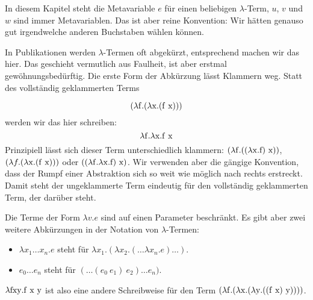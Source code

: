 In diesem Kapitel steht die Metavariable $e$ für einen
beliebigen $\lambda$-Term, $u$, $v$ und $w$ sind immer Metavariablen.
Das ist aber reine Konvention: Wir hätten genauso gut irgendwelche
anderen Buchstaben wählen können.

In Publikationen werden $\lambda$-Termen oft abgekürzt, entsprechend
machen wir das hier.  Das geschieht vermutlich aus Faulheit, ist aber
erstmal gewöhnungsbedürftig.  Die erste Form der Abkürzung lässt
Klammern weg.  Statt des vollständig geklammerten Terms

\begin{displaymath}
  (\lambda \mathrm f.(\lambda \mathrm x.(\mathrm f~\mathrm x)))
\end{displaymath}
%
werden wir das hier schreiben: 
%
\begin{displaymath}
  \lambda \mathrm f.\lambda \mathrm x.\mathrm f~\mathrm x
\end{displaymath}
%
Prinzipiell lässt sich dieser Term unterschiedlich
klammern: $(\lambda \mathrm f.((\lambda \mathrm x.\mathrm f)~\mathrm x))$, $(\lambda
f.(\lambda \mathrm x.(\mathrm f~\mathrm x)))$ oder $((\lambda \mathrm f.\lambda
\mathrm x.\mathrm f)~\mathrm x)$.  Wir verwenden aber die gängige Konvention,
dass der Rumpf einer Abstraktion sich so weit wie möglich nach
rechts erstreckt.   Damit steht der ungeklammerte Term eindeutig für
den vollständig geklammerten Term, der darüber steht.

Die Terme der Form $\lambda v.e$ sind auf einen Parameter
beschränkt.  Es gibt aber zwei weitere Abkürzungen
in der Notation von $\lambda$-Termen:
%
\begin{itemize}
\item $\lambda x_1 \ldots x_n.e$ steht für $\lambda x_1.(\lambda
  x_2.(\ldots\lambda x_n.e)\ldots)$.
\item $e_0 \ldots e_n$ steht für $(\ldots(e_0~e_1)~e_2) \ldots e_n)$.
\end{itemize}
%
$\lambda \mathrm{fxy}.\mathrm f~\mathrm x~\mathrm y$ ist also eine andere Schreibweise für
den Term $(\lambda \mathrm f.(\lambda \mathrm x.(\lambda \mathrm y.((\mathrm f~\mathrm x)~\mathrm y))))$.


